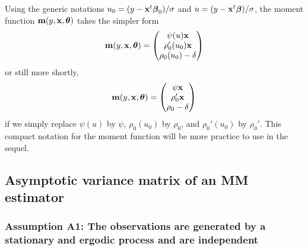 Using the generic notations $u_0 = (y-\mathbf x^t\boldsymbol{\beta}_0)/\sigma$
and $u = (y-\mathbf x^t\boldsymbol\beta)/\sigma$, the moment function
$\mathbf m(y,\mathbf x,\boldsymbol\theta)$ takes the simpler form
\[
    \mathbf m(y,\mathbf x,\boldsymbol\theta) =
    \begin{pmatrix}
        \psi(u) \mathbf x       \\
        \rho_0'(u_0) \mathbf x  \\
        \rho_0(u_0) - \delta
    \end{pmatrix}
\]
or still more shortly,
%
\begin{equation}
    \label{Eq:GMM_moment_function_MM}
    \mathbf m(y,\mathbf x,\boldsymbol\theta) =
    \begin{pmatrix}
        \psi\mathbf x       \\
        \rho_0'\mathbf x    \\
        \rho_0-\delta
    \end{pmatrix}
\end{equation}
%
if we simply replace $\psi(u)$ by $\psi$, $\rho_0(u_0)$ by $\rho_0$, and
$\rho_0'(u_0)$ by $\rho_0'$. This compact notation for the moment function will
be more practice to use in the sequel.

\subsection{Asymptotic variance matrix of an MM estimator}

\subsubsection{Assumption A1: The observations are generated by a stationary and ergodic process and are independent}

